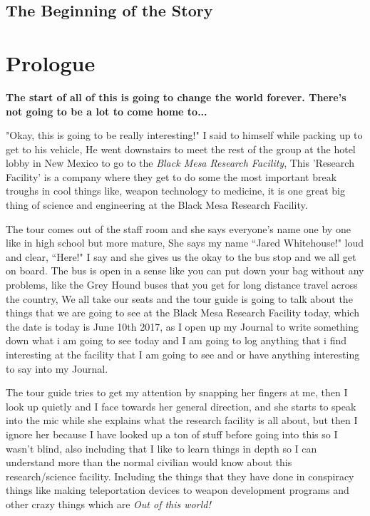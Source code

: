 \documentclass[14pt,letterpaper]{book}
\begin{document}
\section{The Beginning of the Story}
\chapter{Prologue}

\textbf{The start of all of this is going to change the world forever. There's not going to be a lot to come home to...}

"Okay, this is going to be really interesting!" I said to himself while packing up to get to his vehicle, He went downstairs to meet the rest of the group at the hotel lobby in New Mexico to go to the \textit{Black Mesa Research Facility}, This 'Research Facility' is a company where they get to do some the most important break troughs in cool things like, weapon technology to medicine, it is one great big thing of science and engineering at the Black Mesa Research Facility.

The tour comes out of the staff room and she says everyone's name one by one like in high school but more mature, She says my name ``Jared Whitehouse!" loud and clear, ``Here!" I say and she gives us the okay to the bus stop and we all get on board. The bus is open in a sense like you can put down your bag without any problems, like the Grey Hound buses that you get for long distance travel across the country, We all take our seats and the tour guide is going to talk about the things that we are going to see at the Black Mesa Research Facility today, which the date is today is June 10th 2017, as I open up my Journal to write something down what i am going to see today and I am going to log anything that i find interesting at the facility that I am going to see and or have anything interesting to say into my Journal. 

The tour guide tries to get my attention by snapping her fingers at me, then I look up quietly and I face towards her general direction, and she starts to speak into the mic while she explains what the research facility is all about, but then I ignore her because I have looked up a ton of stuff before going into this so I wasn't blind, also including that I like to learn things in depth so I can understand more than the normal civilian would know about this research/science facility. Including the things that they have done in conspiracy things like making teleportation devices to weapon development programs and other crazy things which are \textit{Out of this world!}
\end{document}
